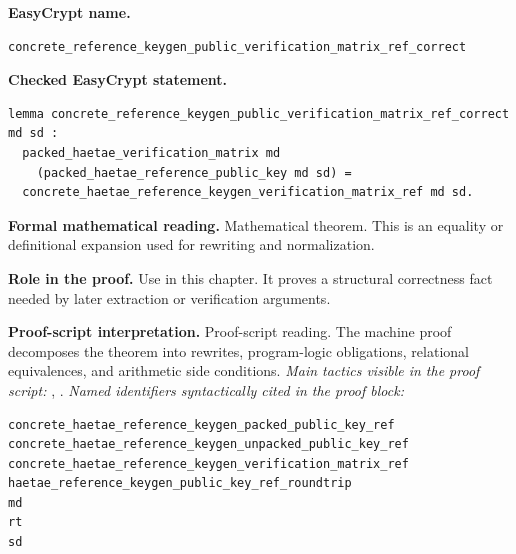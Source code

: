\begin{formaltheorem}
\noindent\textbf{EasyCrypt name.}
\begin{lstlisting}[language=EasyCrypt,basicstyle=\ttfamily\scriptsize]
concrete_reference_keygen_public_verification_matrix_ref_correct
\end{lstlisting}
\noindent\textbf{Checked EasyCrypt statement.}
\begin{lstlisting}[language=EasyCrypt,basicstyle=\ttfamily\scriptsize]
lemma concrete_reference_keygen_public_verification_matrix_ref_correct md sd :
  packed_haetae_verification_matrix md
    (packed_haetae_reference_public_key md sd) =
  concrete_haetae_reference_keygen_verification_matrix_ref md sd.
\end{lstlisting}
\noindent\textbf{Formal mathematical reading.}
Mathematical theorem. This is an equality or definitional expansion used for rewriting and normalization.

\noindent\textbf{Role in the proof.}
Use in this chapter. It proves a structural correctness fact needed by later extraction or verification arguments.

\noindent\textbf{Proof-script interpretation.}
Proof-script reading. The machine proof decomposes the theorem into rewrites, program-logic obligations, relational equivalences, and arithmetic side conditions.
\emph{Main tactics visible in the proof script:} , .
\emph{Named identifiers syntactically cited in the proof block:}
\begin{lstlisting}[language=EasyCrypt,basicstyle=\ttfamily\scriptsize]
concrete_haetae_reference_keygen_packed_public_key_ref
concrete_haetae_reference_keygen_unpacked_public_key_ref
concrete_haetae_reference_keygen_verification_matrix_ref
haetae_reference_keygen_public_key_ref_roundtrip
md
rt
sd
\end{lstlisting}

\end{formaltheorem}

